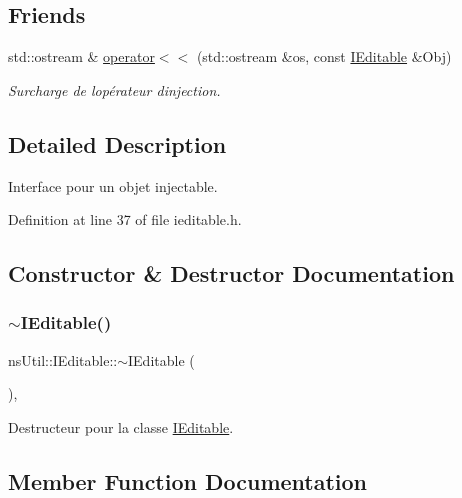 \subsection*{Friends}
\begin{DoxyCompactItemize}
\item 
std\+::ostream \& \hyperlink{classns_util_1_1_i_editable_a53db4e7832b7c4579b331800bb0cae70}{operator$<$$<$} (std\+::ostream \&os, const \hyperlink{classns_util_1_1_i_editable}{I\+Editable} \&Obj)
\begin{DoxyCompactList}\small\item\em Surcharge de l\textquotesingle{}opérateur d\textquotesingle{}injection. \end{DoxyCompactList}\end{DoxyCompactItemize}


\subsection{Detailed Description}
Interface pour un objet injectable. 

Definition at line 37 of file ieditable.\+h.



\subsection{Constructor \& Destructor Documentation}
\mbox{\label{classns_util_1_1_i_editable_a504b91af8e4efa46357d7236b86b8e2e}} 
\subsubsection{\texorpdfstring{$\sim$\+I\+Editable()}{~IEditable()}}
{\footnotesize\ttfamily ns\+Util\+::\+I\+Editable\+::$\sim$\+I\+Editable (\begin{DoxyParamCaption}{ }\end{DoxyParamCaption})\hspace{0.3cm}{\ttfamily [virtual]}, {\ttfamily [default]}}



Destructeur pour la classe \hyperlink{classns_util_1_1_i_editable}{I\+Editable}. 



\subsection{Member Function Documentation}
\mbox{\label{classns_util_1_1_i_editable_ab20bbe582b95383ed3f1453109035853}} 

